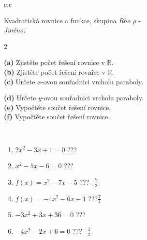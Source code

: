 \documentclass[10pt]{report}
\begin{document}
\begin{tabular}{c:c}
\begin{minipage}[c][104.5mm][t]{0.5\linewidth}
\begin{center}
\vspace{7mm}
{\huge \LARGE Kvadratická rovnice a funkce, skupina \textit{Rho $\rho$} -}\\[5mm]
\textit{Jméno:}\phantom{xxxxxxxxxxxxxxxxxxxxxxxxxxxxxxxxxxxxxxxxxxxxxxxxxxxxxxxxxxxxxxxxx}\\[5mm]
\begin{minipage}{0.95\linewidth}
\begin{center}
{\small \begin{multicols}{2} \raggedright
\textbf{(a)} Zjistěte počet řešení rovnice v \(\mathbb{R}\). \\[1mm]
\textbf{(b)} Zjistěte počet řešení rovnice v \(\mathbb{R}\). \\[1mm]
\textbf{(c)} Určete \(x\)-ovou souřadnici vrcholu paraboly. \par \columnbreak
\textbf{(d)} Určete \(y\)-ovou souřadnici vrcholu paraboly. \\[1mm]
\textbf{(e)} Vypočtěte součet řešení rovnice. \\[1mm]
\textbf{(f)} Vypočtěte součet řešení rovnice.
\end{multicols}
}
\end{center}
\end{minipage}
\\[4mm]
\begin{minipage}{0.79\linewidth}
\begin{center}
\begin{varwidth}{\linewidth}
\begin{enumerate}
\Large
\item $2x^2-3x+1=0$\quad \dotfill\; ???\;\dotfill {}
\item $x^2-5x-6=0$\quad \dotfill\; ???\;\dotfill {}
\item $f(x)=x^2-7x-5$\quad \dotfill\; ???\;\dotfill \quad $-\frac{7}{2}$
\item $f(x)=-4x^2-6x-1$\quad \dotfill\; ???\;\dotfill \quad $\frac{7}{4}$
\item $-3x^2+3x+36=0$\quad \dotfill\; ???\;\dotfill {}
\item $-4x^2-2x+6=0$\quad \dotfill\; ???\;\dotfill \quad $-\frac{1}{2}$
\end{enumerate}
\end{varwidth}
\end{center}
\end{minipage}

\end{center}
\end{minipage}
\end{tabular}
\end{document}
